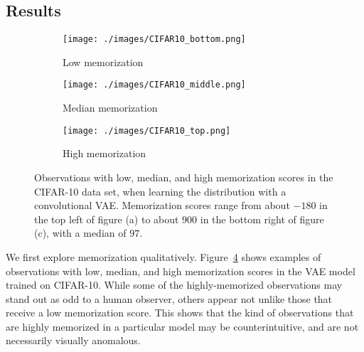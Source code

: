 \documentclass{article}
\begin{document}
\subsection{Results}
\label{sub:results}

\begin{figure}[tb]
	\centering
	\captionsetup[subfigure]{justification=centering}%
	\begin{subfigure}[b]{.30\textwidth}
		\texttt{[image: ./images/CIFAR10\_bottom.png]}
		\caption{Low memorization \label{fig:cifar10_bottom}}
	\end{subfigure}
	\quad
	\begin{subfigure}[b]{.30\textwidth}
		\texttt{[image: ./images/CIFAR10\_middle.png]}
		\caption{Median memorization \label{fig:cifar10_middle}}
	\end{subfigure}
	\quad
	\begin{subfigure}[b]{.30\textwidth}
		\texttt{[image: ./images/CIFAR10\_top.png]}
		\caption{High memorization \label{fig:cifar10_top}}
	\end{subfigure}
	\caption{Observations with low, median, and high memorization scores 
		in the CIFAR-10 data set, when learning the distribution with 
		a convolutional VAE. Memorization scores range from about 
		$-180$ in the top left of figure (a) to about $900$ in the 
		bottom right of figure (c), with a median of $97$.  
		\label{fig:cifar10_mem}}
\end{figure}

We first explore memorization qualitatively. Figure~\ref{fig:cifar10_mem} 
shows examples of observations with low, median, and high memorization scores 
in the VAE model trained on CIFAR-10. While some of the highly-memorized 
observations may stand out as odd to a human observer, others appear not 
unlike those that receive a low memorization score. This shows that the kind 
of observations that are highly memorized in a particular model may be 
counterintuitive, and are not necessarily visually anomalous.
\end{document}

